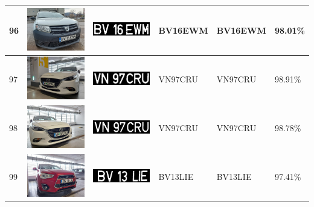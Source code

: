 \documentclass[a4paper,12pt]{report}
\begin{document}
\begin{longtable}{| m{0.6cm} | m{3cm} | m{3cm} | m{1.8cm} | m{1.8cm} | m{1.8cm} |}
    96  & \includegraphics[width=3cm,keepaspectratio]{dataset/56_s1.jpg}  & \includegraphics[width=3cm,keepaspectratio]{segmentari/96.jpg}  & BV16EWM             & BV16EWM              & 98.01\%    \\ \hline
    97  & \includegraphics[width=3cm,keepaspectratio]{dataset/57_d1.jpg}  & \includegraphics[width=3cm,keepaspectratio]{segmentari/97.jpg}  & VN97CRU             & VN97CRU              & 98.91\%    \\ \hline
    98  & \includegraphics[width=3cm,keepaspectratio]{dataset/57_s1.jpg}  & \includegraphics[width=3cm,keepaspectratio]{segmentari/98.jpg}  & VN97CRU             & VN97CRU              & 98.78\%    \\ \hline
    99  & \includegraphics[width=3cm,keepaspectratio]{dataset/58_s1.jpg}  & \includegraphics[width=3cm,keepaspectratio]{segmentari/99.jpg}  & BV13LIE             & BV13LIE              & 97.41\%    \\ \hline

\end{longtable}
\end{document}
